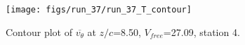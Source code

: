 \begin{figure}[H]
\centering
\texttt{[image: figs/run\_37/run\_37\_T\_contour]}
\caption{Contour plot of $\overline{v_{\theta}}$ at $z/c$=8.50, $V_{free}$=27.09, station 4.}
\label{fig:run_37_T_contour}
\end{figure}


